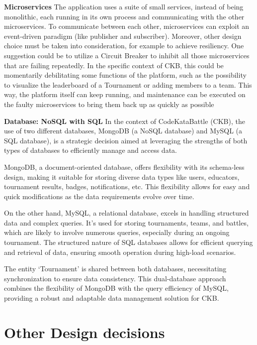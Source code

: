 \textbf{Microservices}\newline
The application uses a suite of small services, instead of being monolithic, 
each running in its own process and communicating with the other microservices. 
To communicate between each other, microservices can exploit an event-driven paradigm (like publisher and subscriber). 
Moreover, other design choice must be taken into consideration, for example to achieve resiliency. 
One suggestion could be to utilize a Circuit Breaker to inhibit all those microservices that are failing repeatedly. 
In the specific context of CKB, this could be momentarily debilitating some functions of the platform, 
such as the possibility to visualize the leaderboard of a Tournament or adding members to a team. 
This way, the platform itself can keep running, and maintenance can be executed on the faulty microservices to bring them back up as quickly as possible

\textbf{Database: NoSQL with SQL}\newline
In the context of CodeKataBattle (CKB), the use of two different databases, MongoDB (a NoSQL database) and MySQL (a SQL database), 
is a strategic decision aimed at leveraging the strengths of both types of databases to efficiently manage and access data.

MongoDB, a document-oriented database, offers flexibility with its schema-less design, 
making it suitable for storing diverse data types like users, educators, tournament results, badges, notifications, etc. 
This flexibility allows for easy and quick modifications as the data requirements evolve over time.

On the other hand, MySQL, a relational database, 
excels in handling structured data and complex queries. 
It’s used for storing tournaments, teams, and battles, which are likely to involve numerous queries, 
especially during an ongoing tournament. The structured nature of SQL databases allows for efficient querying and retrieval of data, 
ensuring smooth operation during high-load scenarios.

The entity ‘Tournament’ is shared between both databases, 
necessitating synchronization to ensure data consistency. 
This dual-database approach combines the flexibility of MongoDB with the query efficiency of MySQL, 
providing a robust and adaptable data management solution for CKB.

\section{Other Design decisions}

